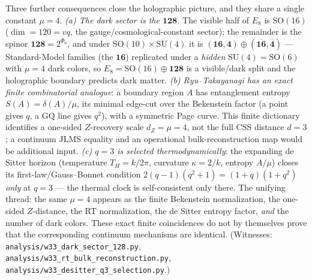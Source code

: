 \documentclass[11pt]{article}
\begin{document}
Three further consequences close the holographic picture, and they share a single
constant $\mu=4$. \emph{(a) The dark sector is the $\mathbf{128}$.} The visible
half of $E_8$ is $\mathrm{SO}(16)$ ($\dim=120=vq$, the gauge/cosmological-constant
sector); the remainder is the spinor $\mathbf{128}=2^{\Phi_6}$, and under
$\mathrm{SO}(10)\times\mathrm{SU}(4)$ it is $(\mathbf{16},\mathbf 4)\oplus(\overline{\mathbf{16}},\overline{\mathbf 4})$
--- Standard-Model families (the $\mathbf{16}$) replicated under a \emph{hidden}
$\mathrm{SU}(4)=\mathrm{SO}(6)$ with $\mu=4$ dark colors, so $E_8=\mathrm{SO}(16)\oplus\mathbf{128}$
is a visible/dark split and the holographic boundary predicts dark matter.
\emph{(b) Ryu--Takayanagi has an exact finite combinatorial analogue}: a boundary region $A$ has
entanglement entropy $S(A)=\delta(A)/\mu$, its minimal edge-cut over the Bekenstein
factor (a point gives $q$, a $\mathrm{GQ}$ line gives $q^2$), with a symmetric Page
curve.  This finite dictionary identifies a one-sided $Z$-recovery scale
$d_Z=\mu=4$, not the full CSS distance $d=3$; a continuum JLMS equality and an
operational bulk-reconstruction map would be additional input.
\emph{(c) $q=3$ is selected thermodynamically}: the expanding de Sitter
horizon (temperature $T_H=k/2\pi$, curvature $\kappa=2/k$, entropy $A/\mu$) closes
its first-law/Gauss--Bonnet condition $2(q-1)(q^2+1)=(1+q)(1+q^2)$ \emph{only} at
$q=3$ --- the thermal clock is self-consistent only there. The unifying thread:
the same $\mu=4$ appears as the finite Bekenstein normalization, the one-sided
$Z$-distance, the RT normalization, the de Sitter entropy factor, \emph{and} the
number of dark colors.  These exact finite coincidences do not by themselves prove
that the corresponding continuum mechanisms are identical. (Witnesses:
\texttt{analysis/w33\_dark\_sector\_128.py},
\texttt{analysis/w33\_rt\_bulk\_reconstruction.py},
\texttt{analysis/w33\_desitter\_q3\_selection.py}.)
\end{document}

